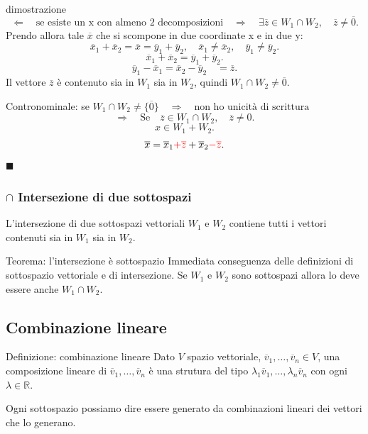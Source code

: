 \documentclass[x11names]{article}
\newcommand*{\QEDA}{\null\nobreak\hfill\ensuremath{\blacksquare}}%
\begin{document}
\begin{es}{dimostrazione}
\[
\Leftarrow \quad \text{se esiste un x con almeno 2 decomposizioni} \quad \Rightarrow \quad \exists \overline{z} \in W_1 \cap W_2,\quad \overline{z} \neq \overline{0}
.\] 
Prendo allora tale $\overline{x}$ che si scompone in due coordinate x e in due y:
\[
\overline{x}_{1} + \overline{x}_{2} = \overline{x} = \overline{y}_{1} + \overline{y}_{2}, \quad \overline{x}_{1} \neq \overline{x}_{2}, \quad \overline{y}_{1} \neq \overline{y}_{2}
.\] 
\[
\overline{x}_{1} + \overline{x}_{2} = \overline{y}_{1} + \overline{y}_{2}
.\] 
\[
\overline{y}_{1} - \overline{x}_{1} = \overline{x}_{2} - \overline{y}_{2} \quad = \overline{z}
.\] 
Il vettore $\overline{z}$ è contenuto sia in $W_1$ sia in $W_2$, quindi $W_1 \cap W_2 \neq \overline{0}$.

Contronominale: se $W_1 \cap W_2 \neq \{\overline{0}\} \quad \Rightarrow \quad \text{non ho unicità di scrittura}$
\[
\Rightarrow \quad \text{Se} \quad \overline{z} \in W_1 \cap W_2, \quad\overline{z} \neq 0
.\] 
\[
x \in W_1 + W_2
.\] 
\[
\overline{x} = \overline{x}_{1} \textcolor{red}{+\overline{z}} + \overline{x}_{2} \textcolor{red}{-\overline{z}}
.\] 
\QEDA
\end{es}


\subsubsection{$\cap$ Intersezione di due sottospazi}
L'intersezione di due sottospazi vettoriali $W_1$ e $W_2$ contiene tutti i vettori contenuti sia in $W_1$ sia in $W_2$.

\begin{center}
\colorbox{myred}{\begin{minipage}{5.75in}
\begin{redes}{Teorema: l'intersezione è sottospazio}
Immediata conseguenza delle definizioni di sottospazio vettoriale e di intersezione. Se $W_1$ e $W_2$ sono sottospazi allora lo deve essere anche $W_1 \cap W_2$.
\end{redes}
\end{minipage}}        
\end{center}



\subsection{Combinazione lineare}

\begin{center}
\colorbox{myblue}{\begin{minipage}{5.75in}
\begin{blues}{Definizione: combinazione lineare}
Dato $V$ spazio vettoriale, $\overline{v}_{1},\dots,\overline{v}_{n} \in V$, una composizione lineare di $\overline{v}_{1},\dots,\overline{v}_{n}$ è una strutura del tipo $\lambda_{1}\overline{v}_{1},\dots,\lambda_{n}\overline{v}_{n}$ con ogni $\lambda \in \mathbb{R}$.
\end{blues}
\end{minipage}}        
\end{center}
Ogni sottospazio possiamo dire essere generato da combinazioni lineari dei vettori che lo generano. 
\end{document}
